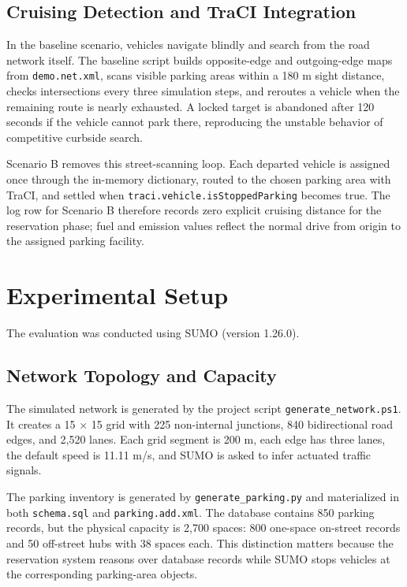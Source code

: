 \documentclass[conference]{IEEEtran}
\begin{document}
\subsection{Cruising Detection and TraCI Integration}
In the baseline scenario, vehicles navigate blindly and search from the road network itself. The baseline script builds opposite-edge and outgoing-edge maps from \texttt{demo.net.xml}, scans visible parking areas within a 180 m sight distance, checks intersections every three simulation steps, and reroutes a vehicle when the remaining route is nearly exhausted. A locked target is abandoned after 120 seconds if the vehicle cannot park there, reproducing the unstable behavior of competitive curbside search.

Scenario B removes this street-scanning loop. Each departed vehicle is assigned once through the in-memory dictionary, routed to the chosen parking area with TraCI, and settled when \texttt{traci.vehicle.isStoppedParking} becomes true. The log row for Scenario B therefore records zero explicit cruising distance for the reservation phase; fuel and emission values reflect the normal drive from origin to the assigned parking facility.

\section{Experimental Setup}
The evaluation was conducted using SUMO (version 1.26.0).

\subsection{Network Topology and Capacity}
The simulated network is generated by the project script \texttt{generate\_network.ps1}. It creates a 15 $\times$ 15 grid with 225 non-internal junctions, 840 bidirectional road edges, and 2,520 lanes. Each grid segment is 200 m, each edge has three lanes, the default speed is 11.11 m/s, and SUMO is asked to infer actuated traffic signals.

The parking inventory is generated by \texttt{generate\_parking.py} and materialized in both \texttt{schema.sql} and \texttt{parking.add.xml}. The database contains 850 parking records, but the physical capacity is 2,700 spaces: 800 one-space on-street records and 50 off-street hubs with 38 spaces each. This distinction matters because the reservation system reasons over database records while SUMO stops vehicles at the corresponding parking-area objects.
\end{document}
